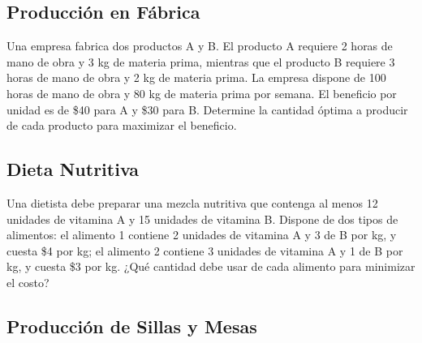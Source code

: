 \documentclass[12pt]{article}
\begin{document}
\begin{enumerate}[label=\alph*)]
    \begin{minipage}{0.45\textwidth}
        \item {}
    \end{minipage}%
    \hfill
    \begin{minipage}{0.45\textwidth}
        \item {}
    \end{minipage}
\end{enumerate}

\subsection{Producción en Fábrica}

Una empresa fabrica dos productos A y B. El producto A requiere 2 horas de mano de obra y 3 kg de materia prima, mientras que el producto B requiere 3 horas de mano de obra y 2 kg de materia prima. La empresa dispone de 100 horas de mano de obra y 80 kg de materia prima por semana. El beneficio por unidad es de \$40 para A y \$30 para B. Determine la cantidad óptima a producir de cada producto para maximizar el beneficio.

\subsection{Dieta Nutritiva}

Una dietista debe preparar una mezcla nutritiva que contenga al menos 12 unidades de vitamina A y 15 unidades de vitamina B. Dispone de dos tipos de alimentos: el alimento 1 contiene 2 unidades de vitamina A y 3 de B por kg, y cuesta \$4 por kg; el alimento 2 contiene 3 unidades de vitamina A y 1 de B por kg, y cuesta \$3 por kg. ¿Qué cantidad debe usar de cada alimento para minimizar el costo?

\subsection{Producción de Sillas y Mesas}
\end{document}
